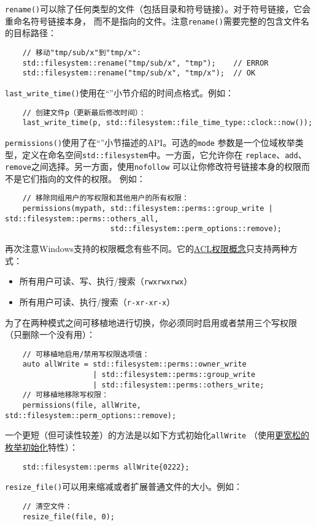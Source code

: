 \texttt{rename()}可以除了任何类型的文件（包括目录和符号链接）。对于符号链接，它会重命名符号链接本身，
而不是指向的文件。注意\texttt{rename()}需要完整的包含文件名的目标路径：
\begin{lstlisting}
    // 移动"tmp/sub/x"到"tmp/x":
    std::filesystem::rename("tmp/sub/x", "tmp");    // ERROR
    std::filesystem::rename("tmp/sub/x", "tmp/x");  // OK
\end{lstlisting}

\texttt{last\_write\_time()}使用在“”小节介绍的时间点格式。例如：
\begin{lstlisting}
    // 创建文件p（更新最后修改时间）：
    last_write_time(p, std::filesystem::file_time_type::clock::now());
\end{lstlisting}

\texttt{permissions()}使用了在“”小节描述的API。可选的\texttt{mode}
参数是一个位域枚举类型，定义在命名空间\texttt{std::filesystem}中。一方面，它允许你在
\texttt{replace}、\texttt{add}、\texttt{remove}之间选择。另一方面，使用\texttt{nofollow}
可以让你修改符号链接本身的权限而不是它们指向的文件的权限。
例如：
\begin{lstlisting}
    // 移除同组用户的写权限和其他用户的所有权限：
    permissions(mypath, std::filesystem::perms::group_write | std::filesystem::perms::others_all,
                        std::filesystem::perm_options::remove);
\end{lstlisting}
再次注意Windows支持的权限概念有些不同。它的\hyperref[ACL]{ACL权限概念}只支持两种方式：\label{可移植的修改权限}
\begin{itemize}
    \item 所有用户可读、写、执行/搜索（\texttt{rwxrwxrwx}）
    \item 所有用户可读、执行/搜索（\texttt{r-xr-xr-x}）
\end{itemize}
为了在两种模式之间可移植地进行切换，你必须同时启用或者禁用三个写权限
（只删除一个没有用）：
\begin{lstlisting}
    // 可移植地启用/禁用写权限选项值：
    auto allWrite = std::filesystem::perms::owner_write
                    | std::filesystem::perms::group_write
                    | std::filesystem::perms::others_write;
    // 可移植地移除写权限：
    permissions(file, allWrite, std::filesystem::perm_options::remove);
\end{lstlisting}
一个更短（但可读性较差）的方法是以如下方式初始化\texttt{allWrite}
（使用\hyperref[ch8.3]{更宽松的枚举初始化}特性）：
\begin{lstlisting}
    std::filesystem::perms allWrite{0222};
\end{lstlisting}
\texttt{resize\_file()}可以用来缩减或者扩展普通文件的大小。例如：
\begin{lstlisting}
    // 清空文件：
    resize_file(file, 0);
\end{lstlisting}

